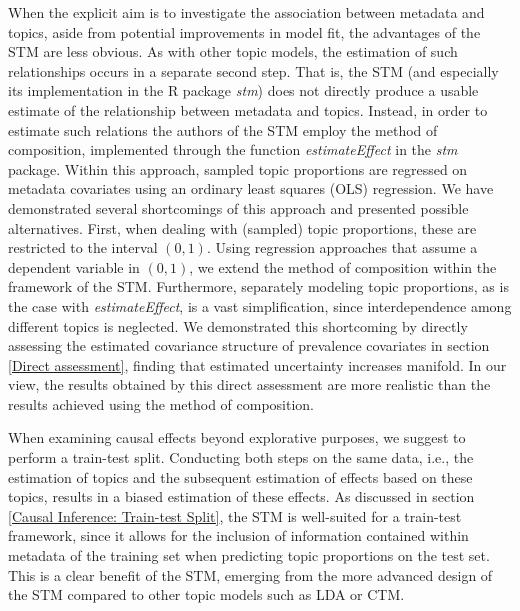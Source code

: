 When the explicit aim is to investigate the association between metadata and topics, aside from potential improvements in model fit, the advantages of the STM are less obvious. As with other topic models, the estimation of such relationships occurs in a separate second step. That is, the STM (and especially its implementation in the R package \textit{stm}) does not directly produce a usable estimate of the relationship between metadata and topics. Instead, in order to estimate such relations the authors of the STM employ the method of composition, implemented through the function \textit{estimateEffect} in the \textit{stm} package. Within this approach, sampled topic proportions are regressed on metadata covariates using an ordinary least squares (OLS) regression. We have demonstrated several shortcomings of this approach and presented possible alternatives. First, when dealing with (sampled) topic proportions, these are restricted to the interval $(0,1)$. Using regression approaches that assume a dependent variable in $(0,1)$, we extend the method of composition within the framework of the STM. Furthermore, separately modeling topic proportions, as is the case with \textit{estimateEffect}, is a vast simplification, since interdependence among different topics is neglected. We demonstrated this shortcoming by directly assessing the estimated covariance structure of prevalence covariates in section \ref{Direct assessment}, finding that estimated uncertainty increases manifold. In our view, the results obtained by this direct assessment are more realistic than the results achieved using the method of composition. 

When examining causal effects beyond explorative purposes, we suggest to perform a train-test split. Conducting both steps on the same data, i.e., the estimation of topics and the subsequent estimation of effects based on these topics, results in a biased estimation of these effects. As discussed in section \ref{Causal Inference: Train-test Split}, the STM is well-suited for a train-test framework, since it allows for the inclusion of information contained within metadata of the training set when predicting topic proportions on the test set. This is a clear benefit of the STM, emerging from the more advanced design of the STM compared to other topic models such as LDA or CTM.